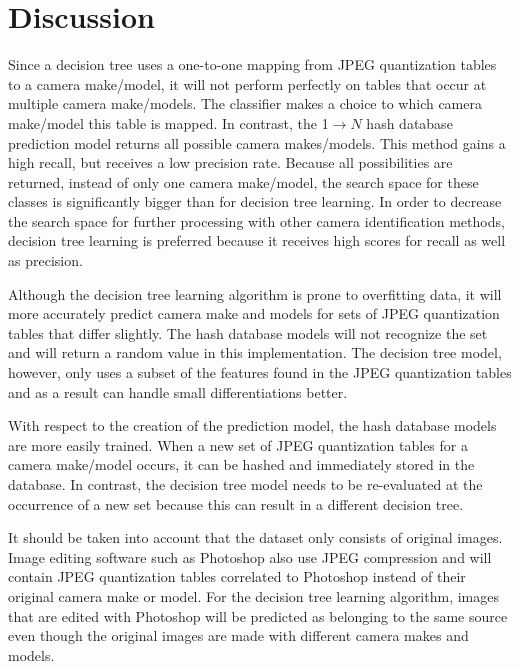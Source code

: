 \section{Discussion}

Since a decision tree uses a one-to-one mapping from JPEG quantization tables to a camera make/model, it will not perform perfectly on tables that occur at multiple camera make/models. The classifier makes a choice to which camera make/model this table is mapped. In contrast, the 
1$\rightarrow N$ hash database prediction model returns all possible camera makes/models. This method gains a high recall, but receives a low precision rate. Because all possibilities are returned, instead of only one camera make/model, the search space for these classes is significantly bigger than for decision tree learning. In order to decrease the search space for further processing with other camera identification methods, decision tree learning is preferred because it receives high scores for recall as well as precision.

Although the decision tree learning algorithm is prone to overfitting data, it will more accurately predict camera make and models for sets of JPEG quantization tables that differ slightly. The hash database models will not recognize the set and will return a random value in this implementation. The decision tree model, however, only uses a subset of the features found in the JPEG quantization tables and as a result can handle small differentiations better.

With respect to the creation of the prediction model, the hash database models are more easily trained. When a new set of JPEG quantization tables for a camera make/model occurs, it can be hashed and immediately stored in the database. In contrast, the decision tree model needs to be re-evaluated at the occurrence of a new set because this can result in a different decision tree.

It should be taken into account that the dataset only consists of original images. Image editing software such as Photoshop also use JPEG compression and will contain JPEG quantization tables correlated to Photoshop instead of their original camera make or model. For the decision tree learning algorithm, images that are edited with Photoshop will be predicted as belonging to the same source even though the original images are made with different camera makes and models. 

